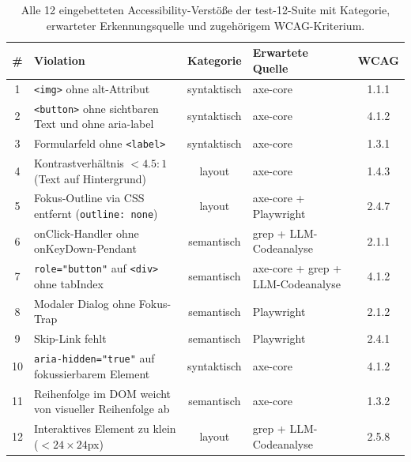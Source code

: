 \begin{table}[htbp]
\centering
\setlength{\tabcolsep}{3.5pt}
\renewcommand{\arraystretch}{1.2}
\caption[Accessibility-Verstöße der test-12-Suite]{Alle 12 eingebetteten Accessibility-Verstöße der test-12-Suite mit Kategorie, erwarteter Erkennungsquelle und zugehörigem WCAG-Kriterium.}
\begin{tabular}{|c|p{5.8cm}|c|p{4.2cm}|c|}
\hline
\textbf{\#} & \textbf{Violation} & \textbf{Kategorie} & \textbf{Erwartete Quelle} & \textbf{WCAG} \\
\hline
1 & \texttt{<img>} ohne alt-Attribut & syntaktisch & axe-core & 1.1.1 \\
\hline
2 & \texttt{<button>} ohne sichtbaren Text und ohne aria-label & syntaktisch & axe-core & 4.1.2 \\
\hline
3 & Formularfeld ohne \texttt{<label>} & syntaktisch & axe-core & 1.3.1 \\
\hline
4 & Kontrastverhältnis $< 4.5:1$ (Text auf Hintergrund) & layout & axe-core & 1.4.3 \\
\hline
5 & Fokus-Outline via CSS entfernt (\texttt{outline: none}) & layout & axe-core + Playwright & 2.4.7 \\
\hline
6 & onClick-Handler ohne onKeyDown-Pendant & semantisch & grep + LLM-Codeanalyse & 2.1.1 \\
\hline
7 & \texttt{role="button"} auf \texttt{<div>} ohne tabIndex & semantisch & axe-core + grep + LLM-Codeanalyse & 4.1.2 \\
\hline
8 & Modaler Dialog ohne Fokus-Trap & semantisch & Playwright & 2.1.2 \\
\hline
9 & Skip-Link fehlt & semantisch & Playwright & 2.4.1 \\
\hline
10 & \texttt{aria-hidden="true"} auf fokussierbarem Element & syntaktisch & axe-core & 4.1.2 \\
\hline
11 & Reihenfolge im DOM weicht von visueller Reihenfolge ab & semantisch & axe-core & 1.3.2 \\
\hline
12 & Interaktives Element zu klein ($<24\times24$px) & layout & grep + LLM-Codeanalyse & 2.5.8 \\
\hline
\end{tabular}
\label{tab:accessibility_verstoesse}
\end{table}

\clearpage

\label{app:erkennungsrate_poc_12}

